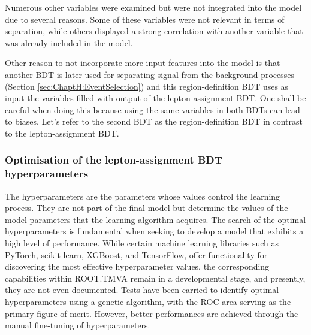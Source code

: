 Numerous other variables were examined but were not integrated into the model due to several reasons.
 Some of these variables were not relevant in terms of separation, while others displayed a strong correlation 
 with another variable that was already included in the model.


Other reason to not incorporate more input features into the model is that another BDT is later used for separating
signal from the background processes (Section \ref{sec:ChaptH:EventSelection}) and this region-definition BDT uses
as input the variables filled with output of the lepton-assignment BDT. One shall be careful when doing this because
using the same variables in both BDTs can lead to biases. Let's refer to the second BDT as the
region-definition BDT in contrast to the lepton-assignment BDT.


\subsubsection{Optimisation of the lepton-assignment BDT hyperparameters}
\label{sec:ChaptH:Sig:LepAsign:SS:BDT:hyperparameters}
The hyperparameters are the parameters whose values control the learning process.
They are not part of the final model but determine the values of the model parameters that
the learning algorithm acquires. The search of the optimal hyperparameters is fundamental 
when seeking to develop a model that exhibits a high level of performance. 
While certain machine learning libraries such as PyTorch, scikit-learn, XGBoost, and TensorFlow, 
offer functionality for discovering the most effective hyperparameter values, 
the corresponding capabilities within ROOT.TMVA remain in a developmental stage, 
and presently, they are not even documented. Tests have been carried to identify optimal 
hyperparameters using a genetic algorithm, with the ROC area serving as the primary figure of merit. 
However, better performances are achieved through the manual fine-tuning of hyperparameters.

